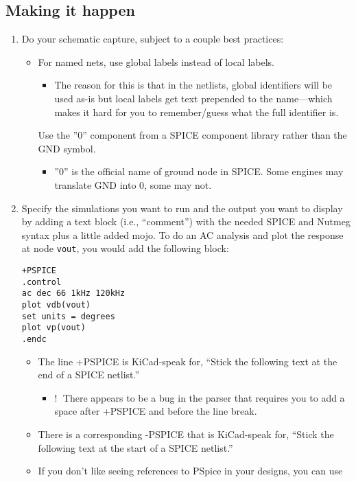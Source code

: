 \subsection{Making it happen}

\begin{enumerate}
  \item
Do your schematic capture, subject to a couple best practices:
\begin{itemize}
  \item
For named nets, use global labels instead of local labels.
\begin{itemize}
  \item
The reason for this is that in the netlists, global identifiers will be used
as-is but local labels get text prepended to the name—which makes it hard for
you to remember/guess what the full identifier is.
\end{itemize}
Use the ”0” component from a SPICE component library rather than the GND symbol.
\begin{itemize}
  \item
”0” is the official name of ground node in SPICE. Some engines may translate GND
into 0, some may not.
\end{itemize}
\end{itemize}
  \item
Specify the simulations you want to run and the output you want to display by
adding a text block (i.e., “comment”) with the needed SPICE and Nutmeg syntax
plus a little added mojo. To do an AC analysis and plot the response at node
\verb|vout|, you would add the following block:
\begin{lstlisting}
+PSPICE
.control
ac dec 66 1kHz 120kHz
plot vdb(vout)
set units = degrees
plot vp(vout)
.endc
\end{lstlisting}
\begin{itemize}
  \item
The line +PSPICE is KiCad-speak for, “Stick the following text at the end of a
SPICE netlist.”
\begin{itemize}
  \item
\textcircled{!} There appears to be a bug in the parser that requires you to add
a space after +PSPICE and before the line break.
\end{itemize}
  \item
There is a corresponding -PSPICE that is KiCad-speak for, “Stick the following
text at the start of a SPICE netlist.”
  \item
If you don't like seeing references to PSpice in your designs, you can use

\end{itemize}
\end{enumerate}
